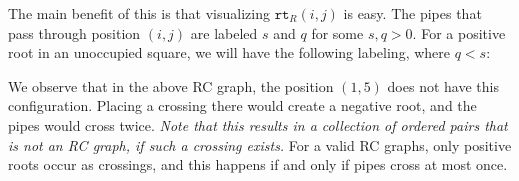 \documentclass{amsart}
\theoremstyle{definition}
\theoremstyle{remark}
\numberwithin{equation}{subsection}
\newcommand{\rtt}{\mathtt{rt}}
\begin{document}
The main benefit of this is that visualizing $\rtt_R(i,j)$ is easy. The pipes that pass through position $(i,j)$ are labeled $s$ and $q$ for some $s,q>0$. For a positive root in an unoccupied square, we will have the following labeling, where $q<s$:

\begin{center}
\end{center}

We observe that in the above RC graph, the position $(1,5)$ does not have this configuration. Placing a crossing there would create a negative root, and the pipes would cross twice. \emph{Note that this results in a collection of ordered pairs that is not an RC graph, if such a crossing exists.} For a valid RC graphs, only positive roots occur as crossings, and this happens if and only if pipes cross at most once.
\end{document}
